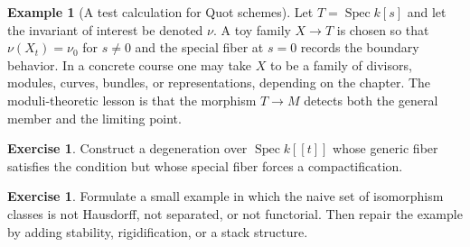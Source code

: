 \documentclass[11pt]{amsart}
\theoremstyle{definition}
\newtheorem{example}[theorem]{Example}
\newtheorem{exercise}[theorem]{Exercise}
\newcommand{\Spec}{\operatorname{Spec}}
\begin{document}
\begin{example}[A test calculation for Quot schemes]
Let $T=\Spec k[s]$ and let the invariant of interest be denoted $\nu$.  A toy family $X\to T$ is chosen so that $\nu(X_t)=\nu_0$ for $s\ne0$ and the special fiber at $s=0$ records the boundary behavior.  In a concrete course one may take $X$ to be a family of divisors, modules, curves, bundles, or representations, depending on the chapter.  The moduli-theoretic lesson is that the morphism $T\to M$ detects both the general member and the limiting point.
\end{example}
\begin{exercise}
Construct a degeneration over $\Spec k[[t]]$ whose generic fiber satisfies the condition but whose special fiber forces a compactification.
\end{exercise}
\begin{exercise}
Formulate a small example in which the naive set of isomorphism classes is not Hausdorff, not separated, or not functorial.  Then repair the example by adding stability, rigidification, or a stack structure.
\end{exercise}
\clearpage
\end{document}
